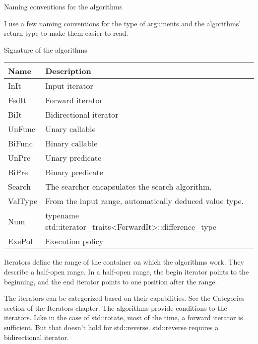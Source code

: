 \begin{myNotic}{Naming conventions for the algorithms}

I use a few naming conventions for the type of arguments and the algorithms’ return type to make them easier to read.

\begin{center}
Signature of the algorithms
\end{center}

\begin{longtable}[c]{|l|l|}
\hline
\textbf{Name} & \textbf{Description}   \\ \hline
\endfirsthead
%
\endhead
%
InIt          & Input iterator         \\ \hline
FedIt         & Forward iterator       \\ \hline
BiIt          & Bidirectional iterator \\ \hline
UnFunc        & Unary callable         \\ \hline
BiFunc        & Binary callable        \\ \hline
UnPre         & Unary predicate        \\ \hline
BiPre         & Binary predicate       \\ \hline
Search  & The searcher encapsulates the search algorithm.                                    \\ \hline
ValType & From the input range, automatically deduced value type.                            \\ \hline
Num     & typename std::iterator\_traits\textless{}ForwardIt\textgreater{}::difference\_type \\ \hline
ExePol        & Execution policy       \\ \hline
\end{longtable}

\end{myNotic}


Iterators define the range of the container on which the algorithms work. They describe a half-open range. In a half-open range, the begin iterator points to the beginning, and the end iterator points to one position after the range.

The iterators can be categorized based on their capabilities. See the Categories section of the Iterators chapter. The algorithms provide conditions to the iterators. Like in the case of std::rotate, most of the time, a forward iterator is sufficient. But that doesn’t hold for std::reverse. std::reverse requires a bidirectional iterator.









